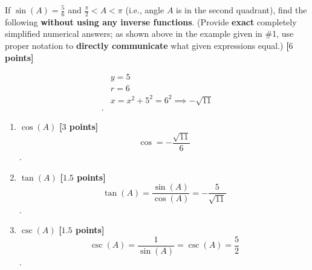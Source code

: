\newpage

\begin{problem}
  If $\sin (A) = \frac{5}{6}$ and $\frac{\pi}{2} < A < \pi$ (i.e., angle $A$ is
  in the second quadrant), find the following \textbf{without using any inverse
  functions}. (Provide \textbf{exact} completely simplified numerical answers;
  as shown above in the example given in \#1, use proper notation to
  \textbf{directly communicate} what given expressions equal.) \textbf{[$6$ points]}

  \begin{align*}
    &y = 5 \\
    &r = 6 \\
    &x = x^{2} + 5^{2} = 6^{2} \implies -\sqrt{11} \\
  .\end{align*}

  \begin{enumerate}
    \item $\cos (A)$ \textbf{[$3$ points]}
      \[ \cos = -\frac{\sqrt{11}}{6} \].
    \item $\tan (A)$ \textbf{[$1.5$ points]}
      \[ \tan (A) = \frac{\sin (A)}{\cos (A)} = -\frac{5}{\sqrt{11}} \].
    \item $\csc (A)$ \textbf{[$1.5$ points]}
      \[ \csc (A) = \frac{1}{\sin (A)} = \csc (A) = \frac{5}{2} \].
  \end{enumerate}
\end{problem}
